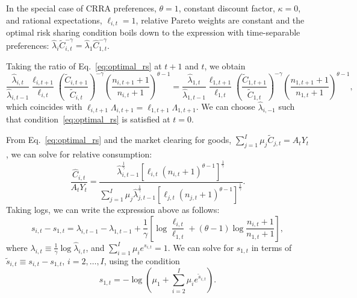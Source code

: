In the special case of CRRA preferences, $\theta =1$, constant discount factor, $\kappa = 0$, and rational expectations, $\ell_{i,t} = 1$, relative Pareto weights are constant and the optimal risk sharing condition boils down to the expression with time-separable preferences: $\hat{\lambda}_i \tilde{C}_{i,t}^{-\gamma} = \hat{\lambda}_1 \hat{C}_{1,t}^{-\gamma}$.

Taking the ratio of Eq.~\eqref{eq:optimal_rs} at $t+1$ and $t$, we obtain
\begin{equation}
    \frac{\hat{\lambda}_{i,t}}{\hat{\lambda}_{i,t-1}} \frac{\ell_{i,t+1}}{\ell_{i,t}} \left( \frac{\tilde{C}_{i,t+1}}{\tilde{C}_{i,t}} \right)^{-\gamma} \left( \frac{n_{i,t+1}+1}{n_{i,t}+1} \right)^{\theta-1} =
    \frac{\hat{\lambda}_{1,t}}{\hat{\lambda}_{1,t-1}} \frac{\ell_{1,t+1}}{\ell_{1,t}}\left( \frac{\tilde{C}_{1,t+1}}{\tilde{C}_{1,t}} \right)^{-\gamma} \left( \frac{n_{1,t+1}+1}{n_{1,t}+1} \right)^{\theta-1},
\end{equation}
which coincides with $\ell_{i,t+1} \Lambda_{i,t+1} = \ell_{1,t+1} \Lambda_{1,t+1}$.
We can choose $\hat{\lambda}_{i,-1}$ such that condition~\eqref{eq:optimal_rs} is satisfied at $t=0$.

From Eq.~\eqref{eq:optimal_rs} and the market clearing for goods, $\sum_{j=1}^I \mu_j \tilde{C}_{j,t} = A_t Y_t$, we can solve for relative consumption:
\begin{equation}
    \frac{\hat{C}_{i,t}}{A_t Y_t} = \frac{\hat{\lambda}_{i,t-1}^{\frac{1}{\gamma}}\left[ \ell_{i,t} (n_{i,t}+1)^{\theta-1}\right]^{\frac{1}{\gamma}} }{\sum_{j=1}^I \mu_j \hat{\lambda}_{j,t-1}^{\frac{1}{\gamma}}\left[ \ell_{j,t} (n_{j,t}+1)^{\theta-1}\right]^{\frac{1}{\gamma}}}.
\end{equation}
Taking logs, we can write the expression above as follows:\small
\begin{equation}
    s_{i,t} - s_{1,t} = \lambda_{i,t-1} - \lambda_{1,t-1} + \frac{1}{\gamma} \left[ \log \frac{\ell_{i,t}}{\ell_{1,t}} + (\theta-1) \log \frac{n_{i,t}+1}{n_{1,t}+1} \right],
\end{equation}\normalsize
where $\lambda_{i,t} \equiv \frac{1}{\gamma}\log \hat{\lambda}_{i,t} $, and $\sum_{i=1}^I \mu_i e^{s_{i,t}} =1$. We can solve for $s_{1,t} $ in terms of $\tilde{s}_{i,t} \equiv s_{i,t} - s_{1,t}$, $i = 2,\ldots, I$, using the condition
\begin{equation}
    s_{1,t} = - \log\left( \mu_1 + \sum_{i=2}^I \mu_i e^{\tilde{s}_{i,t}} \right). 
\end{equation}

